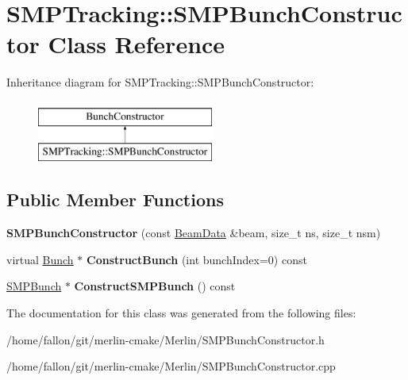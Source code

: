 \hypertarget{classSMPTracking_1_1SMPBunchConstructor}{}\section{S\+M\+P\+Tracking\+:\+:S\+M\+P\+Bunch\+Constructor Class Reference}
\label{classSMPTracking_1_1SMPBunchConstructor}
Inheritance diagram for S\+M\+P\+Tracking\+:\+:S\+M\+P\+Bunch\+Constructor\+:\begin{figure}[H]
\begin{center}
\leavevmode
\includegraphics[height=2.000000cm]{classSMPTracking_1_1SMPBunchConstructor}
\end{center}
\end{figure}
\subsection*{Public Member Functions}
\begin{DoxyCompactItemize}
\item 
\mbox{\label{classSMPTracking_1_1SMPBunchConstructor_af5bd2da53ebf88abfe6a9d1ece3a4c80}} 
{\bfseries S\+M\+P\+Bunch\+Constructor} (const \hyperlink{classBeamData}{Beam\+Data} \&beam, size\+\_\+t ns, size\+\_\+t nsm)
\item 
\mbox{\label{classSMPTracking_1_1SMPBunchConstructor_a0dc19ec0ca5541da81a8886af3a6f3b0}} 
virtual \hyperlink{classBunch}{Bunch} $\ast$ {\bfseries Construct\+Bunch} (int bunch\+Index=0) const
\item 
\mbox{\label{classSMPTracking_1_1SMPBunchConstructor_a2a3fbf5010016e101ee17c0740c74b8a}} 
\hyperlink{classSMPTracking_1_1SMPBunch}{S\+M\+P\+Bunch} $\ast$ {\bfseries Construct\+S\+M\+P\+Bunch} () const
\end{DoxyCompactItemize}


The documentation for this class was generated from the following files\+:\begin{DoxyCompactItemize}
\item 
/home/fallon/git/merlin-\/cmake/\+Merlin/S\+M\+P\+Bunch\+Constructor.\+h\item 
/home/fallon/git/merlin-\/cmake/\+Merlin/S\+M\+P\+Bunch\+Constructor.\+cpp\end{DoxyCompactItemize}
